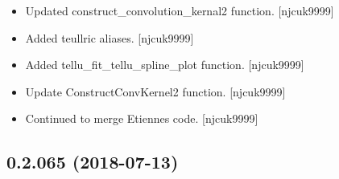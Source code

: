 \documentclass[a4paper,10pt,english]{report}
\begin{document}
\begin{itemize}
\item {} 
Updated construct\_convolution\_kernal2 function. {[}njcuk9999{]}

\item {} 
Added teullric aliases. {[}njcuk9999{]}

\item {} 
Added tellu\_fit\_tellu\_spline\_plot function. {[}njcuk9999{]}

\item {} 
Update ConstructConvKernel2 function. {[}njcuk9999{]}

\item {} 
Continued to merge Etiennes code. {[}njcuk9999{]}

\end{itemize}


\subsection{0.2.065 (2018-07-13)}
\end{document}
